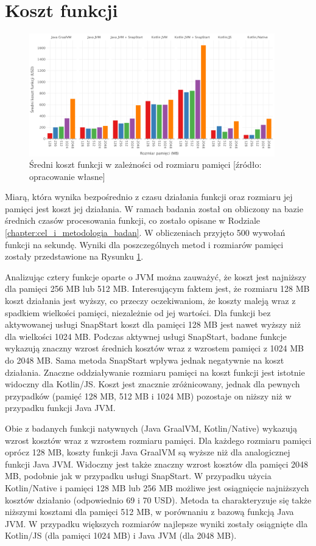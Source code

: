 \section{Koszt funkcji}\label{chapter:results_cost}

\begin{figure}[h]
    \centering
    \includegraphics[width=0.95\textwidth]{charts/results/average-cost.png}
    \caption{Średni koszt funkcji w zależności od rozmiaru pamięci [źródło: opracowanie własne]}
    \label{fig:avg_costs}
\end{figure}

Miarą, która wynika bezpośrednio z czasu działania funkcji oraz rozmiaru jej pamięci jest koszt jej działania.
W ramach badania został on obliczony na bazie średnich czasów procesowania funkcji, co zostało opisane w Rodziale \ref{chapter:cel_i_metodologia_badan}.
W obliczeniach przyjęto 500 wywołań funkcji na sekundę.
Wyniki dla poszczególnych metod i rozmiarów pamięci zostały przedstawione na Rysunku \ref{fig:avg_costs}.

Analizując cztery funkcje oparte o JVM można zauważyć, że koszt jest najniższy dla pamięci 256 MB lub 512 MB.
Interesującym faktem jest, że rozmiaru 128 MB koszt działania jest wyższy, co przeczy oczekiwaniom, że koszty maleją wraz z spadkiem wielkości pamięci, niezależnie od jej wartości.
Dla funkcji bez aktywowanej usługi SnapStart koszt dla pamięci 128 MB jest nawet wyższy niż dla wielkości 1024 MB.
Podczas aktywnej usługi SnapStart, badane funkcje wykazują znaczny wzrost średnich kosztów wraz z wzrostem pamięci z 1024 MB do 2048 MB.
Sama metoda SnapStart wpływa jednak negatywnie na koszt działania.
Znaczne oddziaływanie rozmiaru pamięci na koszt funkcji jest istotnie widoczny dla Kotlin/JS.
Koszt jest znacznie zróżnicowany, jednak dla pewnych przypadków (pamięć 128 MB, 512 MB i 1024 MB) pozostaje on niższy niż w przypadku funkcji Java JVM.

Obie z badanych funkcji natywnych (Java GraalVM, Kotlin/Native) wykazują wzrost kosztów wraz z wzrostem rozmiaru pamięci.
Dla każdego rozmiaru pamięci oprócz 128 MB, koszty funkcji Java GraalVM są wyższe niż dla analogicznej funkcji Java JVM.
Widoczny jest także znaczny wzrost kosztów dla pamięci 2048 MB, podobnie jak w przypadku usługi SnapStart.
W przypadku użycia Kotlin/Native i pamięci 128 MB lub 256 MB możliwe jest osiągnięcie najniższych kosztów działanio (odpowiednio 69 i 70 USD).
Metoda ta charakteryzuje się także niższymi kosztami dla pamięci 512 MB, w porównaniu z bazową funkcją Java JVM.
W przypadku większych rozmiarów najlepsze wyniki zostały osiągnięte dla Kotlin/JS (dla pamięci 1024 MB) i Java JVM (dla 2048 MB).

